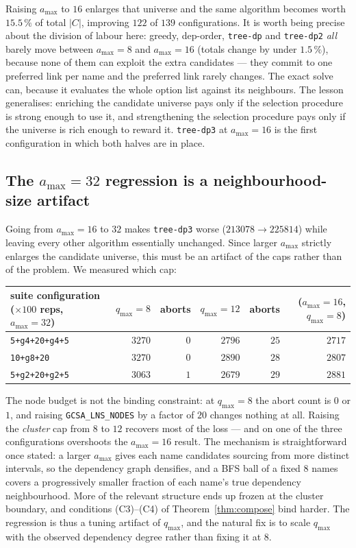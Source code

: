 \documentclass[11pt,a4paper]{article}
\theoremstyle{definition}
\theoremstyle{plain}
\theoremstyle{remark}
\begin{document}
Raising $a_{\max}$ to $16$ enlarges that universe and the same algorithm
becomes worth $15.5\,\%$ of total $|C|$, improving $122$ of $139$
configurations. It is worth being precise about the division of labour
here: greedy, dep-order, \texttt{tree-dp} and \texttt{tree-dp2} \emph{all}
barely move between $a_{\max} = 8$ and $a_{\max} = 16$ (totals change by
under $1.5\,\%$), because none of them can exploit the extra candidates
--- they commit to one preferred link per name and the preferred link
rarely changes. The exact solve can, because it evaluates the whole
option list against its neighbours. The lesson generalises: enriching the
candidate universe pays only if the selection procedure is strong enough
to use it, and strengthening the selection procedure pays only if the
universe is rich enough to reward it. \texttt{tree-dp3} at
$a_{\max} = 16$ is the first configuration in which both halves are in
place.

\subsection{The $a_{\max} = 32$ regression is a neighbourhood-size artifact}

Going from $a_{\max} = 16$ to $32$ makes \texttt{tree-dp3} worse
($213078 \to 225814$) while leaving every other algorithm essentially
unchanged. Since larger $a_{\max}$ strictly enlarges the candidate
universe, this must be an artifact of the caps rather than of the
problem. We measured which cap:

\begin{center}
\small
\begin{tabular}{@{}lrrrrr@{}}
\toprule
suite configuration ($\times 100$ reps, $a_{\max}=32$)
  & $q_{\max}=8$ & aborts & $q_{\max}=12$ & aborts & ($a_{\max}=16$, $q_{\max}=8$) \\
\midrule
\texttt{5+g4+20+g4+5}  & $3270$ & $0$ & $2796$ & $25$ & $2717$ \\
\texttt{10+g8+20}      & $3270$ & $0$ & $2890$ & $28$ & $2807$ \\
\texttt{5+g2+20+g2+5}  & $3063$ & $1$ & $2679$ & $29$ & $2881$ \\
\bottomrule
\end{tabular}
\end{center}

The node budget is not the binding constraint: at $q_{\max} = 8$ the
abort count is $0$ or $1$, and raising \texttt{GCSA\_LNS\_NODES} by a
factor of $20$ changes nothing at all. Raising the \emph{cluster} cap
from $8$ to $12$ recovers most of the loss --- and on one of the three
configurations overshoots the $a_{\max}=16$ result. The mechanism is
straightforward once stated: a larger $a_{\max}$ gives each name
candidates sourcing from more distinct intervals, so the dependency
graph densifies, and a BFS ball of a fixed $8$ names covers a
progressively smaller fraction of each name's true dependency
neighbourhood. More of the relevant structure ends up frozen at the
cluster boundary, and conditions (C3)--(C4) of
Theorem~\ref{thm:compose} bind harder. The regression is thus a tuning
artifact of $q_{\max}$, and the natural fix is to scale $q_{\max}$ with
the observed dependency degree rather than fixing it at $8$.
\end{document}
